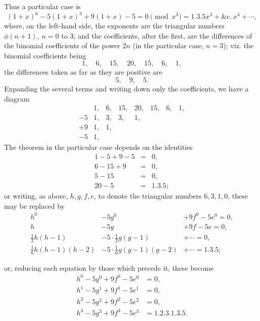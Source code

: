 \documentclass[10pt,twoside]{article}
\begin{document}
Thus a particular case is
\[
(1+x)^6-5(1+x)^3+9(1+x)-5
 =0\pmod {x^3}=1.3.5x^3+\&c.\,x^4+\cdots,
\]
where, on the left-hand side, the exponents are the triangular numbers
\(\phi(n+1)\), \(n=0\) to 3; and the coefficients, after the first, are the
differences of the binomial coefficients of the power \(2n\) (in the particular
case, \(n=3\)); viz. the binomial coefficients being
\[
        1,\quad 6,\quad 15,\quad 20,\quad 15,\quad 6,\quad 1,
\]
the differences taken as far as they are positive are
\[
        5,\quad 9,\quad 5.
\]
Expanding the several terms and writing down only the coefficients, we have a
diagram
\[
\begin{array}{rrrrrrrr}
 &1,&6,&15,&20,&15,&6,&1,\\
-5&1,&3,&3,&1,\\
+9&1,&1,\\
-5&1,
\end{array}
\]
The theorem in the particular case depends on the identities
\[
\begin{array}{rcl}
1-5+9-5&=&0,\\
6-15+9&=&0,\\
5-15&=&0,\\
20-5&=&1.3.5;
\end{array}
\]
or writing, as above, \(h,g,f,e\), to denote the triangular numbers \(6,3,1,0\),
these may be replaced by
\[
\begin{array}{rcl}
h^0&-5g^0&+9f^0-5e^0=0,\\
h&-5g&+9f-5e=0,\\
\frac12h(h-1)&-5\cdot\frac12g(g-1)&+\cdots=0,\\
\frac16h(h-1)(h-2)&-5\cdot\frac16g(g-1)(g-2)&+\cdots=1.3.5;
\end{array}
\]

\newpage

or, reducing each equation by those which precede it, these become
\[
\begin{aligned}
h^0-5g^0+9f^0-5e^0&=0,\\
h^1-5g^1+9f^1-5e^1&=0,\\
h^2-5g^2+9f^2-5e^2&=0,\\
h^3-5g^3+9f^3-5e^3&=1.2.3.1.3.5.
\end{aligned}
\]
\end{document}
